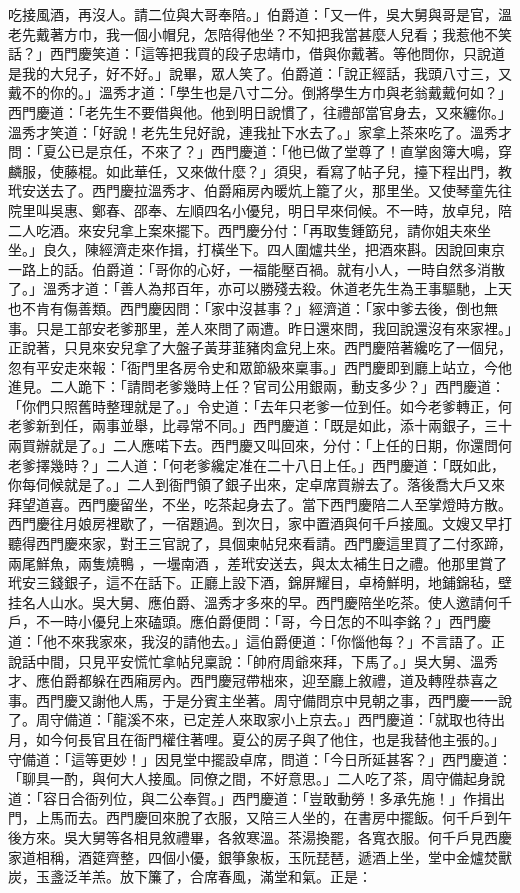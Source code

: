 \begin{showcontents}{}
吃接風酒，再沒人。請二位與大哥奉陪。」伯爵道：「又一件，吳大舅與哥是官，溫老先戴著方巾，我一個小帽兒，怎陪得他坐？不知把我當甚麼人兒看；我惹他不笑話？」西門慶笑道：「這等把我買的段子忠靖巾，借與你戴著。等他問你，只說道是我的大兒子，好不好。」說畢，眾人笑了。伯爵道：「說正經話，我頭八寸三，又戴不的你的。」溫秀才道：「學生也是八寸二分。倒將學生方巾與老翁戴戴何如？」西門慶道：「老先生不要借與他。他到明日說慣了，往禮部當官身去，又來纏你。」溫秀才笑道：「好說！老先生兒好說，連我扯下水去了。」家拿上茶來吃了。溫秀才問：「夏公已是京任，不來了？」西門慶道：「他已做了堂尊了！直掌囪簿大鳴，穿麟服，使藤棍。如此華任，又來做什麼？」須臾，看寫了帖子兒，擡下程出門，教玳安送去了。西門慶拉溫秀才、伯爵廂房內暖炕上籠了火，那里坐。又使琴童先往院里叫吳惠、鄭春、邵奉、左順四名小優兒，明日早來伺候。不一時，放卓兒，陪二人吃酒。來安兒拿上案來擺下。西門慶分付：「再取隻鍾筯兒，請你姐夫來坐坐。」良久，陳經濟走來作揖，打橫坐下。四人圍爐共坐，把酒來斟。因說回東京一路上的話。伯爵道：「哥你的心好，一福能壓百禍。就有小人，一時自然多消散了。」溫秀才道：「善人為邦百年，亦可以勝殘去殺。休道老先生為王事驅馳，上天也不肯有傷善類。西門慶因問：「家中沒甚事？」經濟道：「家中爹去後，倒也無事。只是工部安老爹那里，差人來問了兩遭。昨日還來問，我回說還沒有來家裡。」正說著，只見來安兒拿了大盤子黃芽韮豬肉盒兒上來。西門慶陪著纔吃了一個兒，忽有平安走來報：「衙門里各房令史和眾節級來稟事。」西門慶即到廳上站立，今他進見。二人跪下：「請問老爹幾時上任？官司公用銀兩，動支多少？」西門慶道：「你們只照舊時整理就是了。」令史道：「去年只老爹一位到任。如今老爹轉正，何老爹新到任，兩事並舉，比尋常不同。」西門慶道：「既是如此，添十兩銀子，三十兩買辦就是了。」二人應喏下去。西門慶又叫回來，分付：「上任的日期，你還問何老爹擇幾時？」二人道：「何老爹纔定准在二十八日上任。」西門慶道：「既如此，你每伺候就是了。」二人到衙門領了銀子出來，定卓席買辦去了。落後喬大戶又來拜望道喜。西門慶留坐，不坐，吃茶起身去了。當下西門慶陪二人至掌燈時方散。西門慶往月娘房裡歇了，一宿題過。到次日，家中置酒與何千戶接風。文嫂又早打聽得西門慶來家，對王三官說了，具個柬帖兒來看請。西門慶這里買了二付豕蹄，兩尾鮮魚，兩隻燒鴨 ，一壜南酒 ，差玳安送去，與太太補生日之禮。他那里賞了玳安三錢銀子，這不在話下。正廳上設下酒，錦屏耀目，卓椅鮮明，地鋪錦毡，壁挂名人山水。吳大舅、應伯爵、溫秀才多來的早。西門慶陪坐吃茶。使人邀請何千戶，不一時小優兒上來磕頭。應伯爵便問：「哥，今日怎的不叫李銘？」西門慶道：「他不來我家來，我沒的請他去。」這伯爵便道：「你惱他每？」不言語了。正說話中間，只見平安慌忙拿帖兒稟說：「帥府周爺來拜，下馬了。」吳大舅、溫秀才、應伯爵都躲在西廂房內。西門慶冠帶柮來，迎至廳上敘禮，道及轉陞恭喜之事。西門慶又謝他人馬，于是分賓主坐著。周守備問京中見朝之事，西門慶一一說了。周守備道：「龍溪不來，已定差人來取家小上京去。」西門慶道：「就取也待出月，如今何長官且在衙門權住著哩。夏公的房子與了他住，也是我替他主張的。」守備道：「這等更妙！」因見堂中擺設卓席，問道：「今日所延甚客？」西門慶道：「聊具一酌，與何大人接風。同僚之間，不好意思。」二人吃了茶，周守備起身說道：「容日合衙列位，與二公奉賀。」西門慶道：「豈敢動勞！多承先施！」作揖出門，上馬而去。西門慶回來脫了衣服，又陪三人坐的，在書房中擺飯。何千戶到午後方來。吳大舅等各相見敘禮畢，各敘寒溫。茶湯換罷，各寬衣服。何千戶見西慶家道相稱，酒筵齊整，四個小優，銀箏象板，玉阮琵琶，遞酒上坐，堂中金爐焚獸炭，玉盞泛羊羔。放下簾了，合席春風，滿堂和氣。正是：


\end{showcontents}
